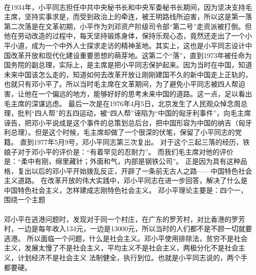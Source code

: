 \documentclass{thuemp}
\begin{document}
\paragraph*{}在1934年，小平同志担任中共中央秘书长和中央军委秘书长期间，因为坚决支持毛主席，坚持实事求是，而受到政治上的牵连，被王明路线所迫害，所以这是第一落
第二次落是在文革初期，小平作为刘邓资产阶级司令部“第二号”走资派被打倒。但他在劳动改造的过程中，每天坚持锻炼身体，保持乐观心态，竟然还走出了一个小平小道，成为一个中外人士探求走访的精神圣地。其实上，这也是小平同志设计中国改革开放和现代化建设重要思想的萌芽地。这第二个“落”，直到1973年被任命为国务院的副总理，实际上，是主席是把小平同志保护起来。因为当时在中国，知道未来中国该怎么走的，知道如何去改革开放让刚刚建国不久的新中国走上正轨的，也就只有邓小平了。所以当时毛主席在文革期间，为了避免小平同志被四人帮迫害，让他在一个偏远的地方，能够好好的思考未来中国的道路。这一点，足以看出毛主席的深谋远虑。
最后一次是在1976年4月5日，北京发生了人民观众悼念周总理，批判“四人帮”的五四运动，被“四人帮”诬陷为“中国的匈牙利事件”，向毛主席诬告，把邓小平说成是这个事件的总策划总后台，把中国形容为中国的纳吉（匈牙利总理）。但是这个时候，毛主席却做了一个很深的伏笔，保留了小平同志的党籍。
直到1977年5月9号，邓小平同志第三次复出。
对于这个三起三落的经历，铁娘子对于邓小平的评价是：“有着罕见的忍耐力”。
而我们毛主席对他的评价是：“柔中有刚，绵里藏针；外面和气，内部是钢铁公司”。
正是因为具有这种品格，复出以后的邓小平开始拨乱反正，开辟了一条前无古人之路——中国特色社会主义道路。
在改革开放的伟大实践中，邓小平同志在进一步回答，解决了什么是中国特色社会主义，怎样建成志刚特色社会主义。
邓小平理论主要是：四个一，
围绕一个主题

\paragraph*{}邓小平在逃港问题时，发现对于同一个村庄，在广东的罗芳村，对比香港的罗芳村，一边是每年收入134元，一边是13000元，所以当时的人们都不是不顾一切就要逃港。
所以面临一个问题，什么是社会主义。邓小平使用排除法，贫穷不是社会主义，发展太慢了不是社会主义，平均主义不是社会主义，两极分化不是社会主义，计划经济不是社会主义
法制健全，执行到位。也就是小平同志说的，两个手都要硬。



\newpage
\end{document}
